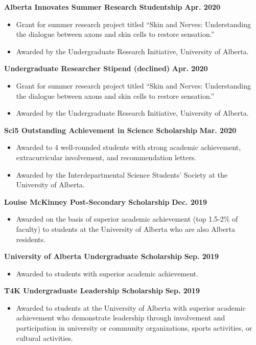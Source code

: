 \documentclass{article}
\begin{document}
    \textbf{Alberta Innovates Summer Research Studentship} \hfill \textbf{Apr. 2020}
    \begin{itemize}
        \item Grant for summer research project titled ``Skin and Nerves: Understanding the dialogue between axons and skin cells to restore sensation.''
        \item Awarded by the Undergraduate Research Initiative, University of Alberta.
    \end{itemize}
    \textbf{Undergraduate Researcher Stipend (declined)} \hfill \textbf{Apr. 2020}
    \begin{itemize}
        \item Grant for summer research project titled ``Skin and Nerves: Understanding the dialogue between axons and skin cells to restore sensation.''
        \item Awarded by the Undergraduate Research Initiative, University of Alberta.
    \end{itemize}
    \textbf{Sci5 Outstanding Achievement in Science Scholarship} \hfill \textbf{Mar. 2020}
    \begin{itemize}
        \item Awarded to 4 well-rounded students with strong academic achievement, extracurricular involvement, and recommendation letters.
        \item Awarded by the Interdepartmental Science Students' Society at the University of Alberta.
    \end{itemize}
    \textbf{Louise McKinney Post-Secondary Scholarship} \hfill \textbf{Dec. 2019}
        \begin{itemize}
            \item Awarded on the basis of superior academic achievement (top 1.5-2\% of faculty) to students at the University of Alberta who are also Alberta residents.
        \end{itemize}
    \textbf{University of Alberta Undergraduate Scholarship} \hfill \textbf{Sep. 2019}
        \begin{itemize}
            \item Awarded to students with superior academic achievement.
        \end{itemize}
    \textbf{T4K Undergraduate Leadership Scholarship} \hfill \textbf{Sep. 2019}
        \begin{itemize}
            \item Awarded to students at the University of Alberta with superior academic achievement who demonstrate leadership through involvement and participation in university or community organizations, sports activities, or cultural activities.
        \end{itemize}
\end{document}

